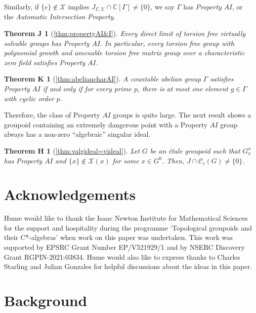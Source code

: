 \documentclass[a4paper, 12pt]{amsart}
\newtheorem*{thmH}{Theorem H}
\newtheorem*{thmJ}{Theorem J}
\newtheorem*{thmK}{Theorem K}
\theoremstyle{definition}
\theoremstyle{remark}
\numberwithin{equation}{section}
\begin{document}
Similarly, if $\{e\}\notin\mathcal{X}$ implies $J_{\Gamma,\mathcal{X}}\cap\mathbb{C}[\Gamma]\neq \{0\}$, we say $\Gamma$ has \emph{Property $AI$}, or the \emph{Automatic Intersection Property}.

\begin{thmJ}[\ref{thm:propertyAI&I}]
Every direct limit of torsion free virtually solvable groups has Property $AI$. In particular, every torsion free group with polynomial growth and amenable torsion free matrix group over a characteristic zero field satisfies Property $AI$.
\end{thmJ}

\begin{thmK}[\ref{thm:abeliancharAI}]
    A countable abelian group $\Gamma$ satisfies Property $AI$ if and only if for every prime $p$, there is at most one element $g\in \Gamma$ with cyclic order $p$.
\end{thmK}

Therefore, the class of Property $AI$ groups is quite large. The next result shows a groupoid containing an extremely dangerous point with a Property $AI$ group always has a non-zero ``algebraic'' singular ideal.

\begin{thmH}[\ref{thm:valgideal=videal}]
    Let $G$ be an \'etale groupoid such that $G^{x}_{x}$ has Property $AI$ and $\{x\}\notin\mathcal{X}(x)$ for some $x\in G^{0}$. Then, $J\cap\mathscr{C}_{c}(G)\neq \{0\}$.
\end{thmH}

\section*{Acknowledgements}

Hume would like to thank the Isaac Newton Institute for Mathematical
Sciences for the support and hospitality during the programme ‘Topological
groupoids and their C*-algebras’ when work on this paper was undertaken.
This work was supported by EPSRC Grant Number EP/V521929/1 and by NSERC Discovery Grant RGPIN-2021-03834. Hume would also like to express thanks to Charles Starling and Julian Gonzales for helpful discussions about the ideas in this paper.

\section{Background}
\label{s:bckgrnd}
\end{document}
